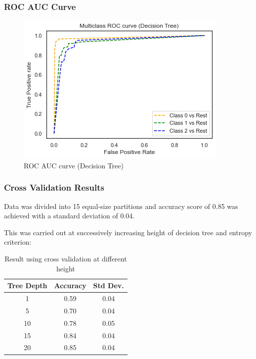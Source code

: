 \documentclass[12pt, letter]{article}
\begin{document}
\pagebreak

\subsubsection{ROC AUC Curve}
\begin{figure}[h]
    \centering
    \includegraphics[scale = 0.8]{ROC_DT.png}
    \caption{ROC AUC curve (Decision Tree)}
    \label{ROC_DT}
\end{figure}

\subsubsection{Cross Validation Results}

Data was divided into 15 equal-size partitions and accuracy score of 0.85 was achieved with a standard deviation of 0.04. 

This was carried out at successively increasing height of decision tree and entropy criterion: \\

\begin{table}[h]
\centering
\caption{Result using cross validation at different height}
\label{tab:my_label}
\begin{tabular}{c|c|c}
\hline
Tree Depth & Accuracy & Std Dev. \\
\hline
\midrule
1 & 0.59 & 0.04 \\
5 & 0.70 & 0.04 \\
10 & 0.78 & 0.05 \\
15 & 0.84 & 0.04 \\
20 & 0.85 & 0.04 \\ 
\hline    
\end{tabular}
\end{table}

\pagebreak
\end{document}
